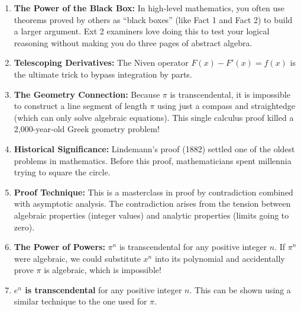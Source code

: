 \begin{takeaways}
\begin{enumerate}
    \item \textbf{The Power of the Black Box:} In high-level mathematics, you often use theorems proved by others as ``black boxes'' (like Fact 1 and Fact 2) to build a larger argument. Ext 2 examiners love doing this to test your logical reasoning without making you do three pages of abstract algebra.
    \item \textbf{Telescoping Derivatives:} The Niven operator $F(x) - F'(x) = f(x)$ is the ultimate trick to bypass integration by parts. 
    \item \textbf{The Geometry Connection:} Because $\pi$ is transcendental, it is impossible to construct a line segment of length $\pi$ using just a compass and straightedge (which can only solve algebraic equations). This single calculus proof killed a 2,000-year-old Greek geometry problem!
    \item \textbf{Historical Significance:} Lindemann's proof (1882) settled one of the oldest problems in mathematics. Before this proof, mathematicians spent millennia trying to square the circle.
    \item \textbf{Proof Technique:} This is a masterclass in proof by contradiction combined with asymptotic analysis. The contradiction arises from the tension between algebraic properties (integer values) and analytic properties (limits going to zero).
    \item \textbf{The Power of Powers:} $\pi^n$ is transcendental for any positive integer $n$. If $\pi^n$ were algebraic, we could substitute $x^n$ into its polynomial and accidentally prove $\pi$ is algebraic, which is impossible!
    \item \textbf{$e^n$ is transcendental} for any positive integer $n$. This can be shown using a similar technique to the one used for $\pi$.
\end{enumerate}
\end{takeaways}

